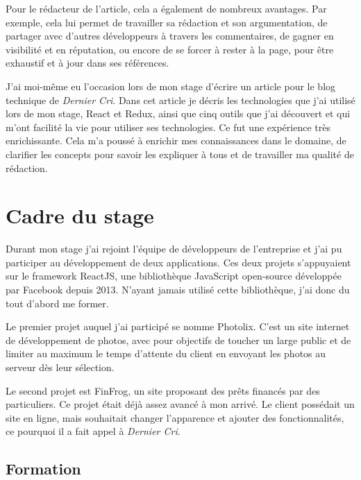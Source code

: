 \bigskip

Pour le rédacteur de l'article, cela a également de nombreux avantages.
Par exemple, cela lui permet de travailler sa rédaction et son
argumentation, de partager avec d'autres développeurs à travers les
commentaires, de gagner en visibilité et en réputation, ou encore de se
forcer à rester à la page, pour être exhaustif et à jour dans ses
références.

\bigskip

J'ai moi-même eu l'occasion lors de mon stage d'écrire un article pour
le blog technique de \emph{Dernier Cri}. Dans cet article je décris les
technologies que j'ai utilisé lors de mon stage, React et Redux, ainsi
que cinq outils que j'ai découvert et qui m'ont facilité la vie pour
utiliser ses technologies. Ce fut une expérience très enrichissante.
Cela m'a poussé à enrichir mes connaissances dans le domaine, de
clarifier les concepts pour savoir les expliquer à tous et de travailler
ma qualité de rédaction.

\newpage

\section{Cadre du stage}\label{cadre-du-stage}

\bigskip

Durant mon stage j'ai rejoint l'équipe de développeurs de l'entreprise
et j'ai pu participer au développement de deux applications. Ces deux
projets s'appuyaient sur le framework ReactJS, une bibliothèque
JavaScript open-source développée par Facebook depuis 2013. N'ayant
jamais utilisé cette bibliothèque, j'ai donc du tout d'abord me former.

\bigskip

Le premier projet auquel j'ai participé se nomme Photolix. C'est un site
internet de développement de photos, avec pour objectifs de toucher un
large public et de limiter au maximum le temps d'attente du client en
envoyant les photos au serveur dès leur sélection.

\bigskip

Le second projet est FinFrog, un site proposant des prêts financés par
des particuliers. Ce projet était déjà assez avancé à mon arrivé. Le
client possédait un site en ligne, mais souhaitait changer l'apparence
et ajouter des fonctionnalités, ce pourquoi il a fait appel à
\emph{Dernier Cri}.

\bigskip

\subsection{Formation}\label{formation}

